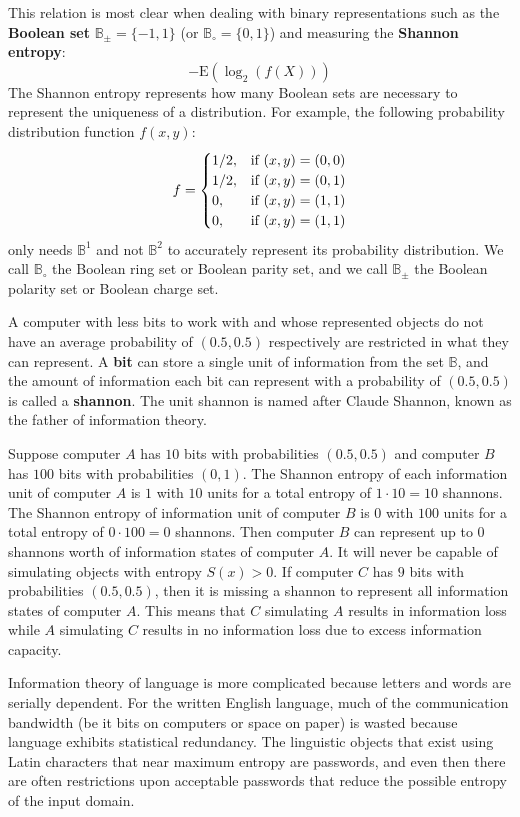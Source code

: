 \documentclass[10pt, a5paper, twoside, openright]{memoir}
\begin{document}
This relation is most clear when dealing with binary representations such as the \textbf{Boolean set} $\mathbb B_\pm = \{ -1, 1\}$ (or $\mathbb B_\circ = \{ 0, 1\}$) and measuring the \textbf{Shannon entropy}:
$$-\mathrm{E}(\log_2(f(X)))$$
The Shannon entropy represents how many Boolean sets are necessary to represent the uniqueness of a distribution. For example, the following probability distribution function $f(x, y)$:
$$f = 
\begin{cases}
1/2, & \textnormal{if} \ (x, y) = (0, 0) \\
1/2, & \textnormal{if} \ (x, y) = (0, 1) \\
0, & \textnormal{if} \ (x, y) = (1, 1) \\
0, & \textnormal{if} \ (x, y) = (1, 1)
\end{cases}
$$
only needs $\mathbb B^1$ and not $\mathbb B^2$ to accurately represent its probability distribution. We call $\mathbb B_\circ$ the Boolean ring set or Boolean parity set, and we call $\mathbb B_\pm$ the Boolean polarity set or Boolean charge set.

A computer with less bits to work with and whose represented objects do not have an average probability of $(0.5, 0.5)$ respectively are restricted in what they can represent. A \textbf{bit} can store a single unit of information from the set $\mathbb B$, and the amount of information each bit can represent with a probability of $(0.5, 0.5)$ is called a \textbf{shannon}. The unit shannon is named after Claude Shannon, known as the father of information theory. 

Suppose computer $A$ has $10$ bits with probabilities $(0.5, 0.5)$ and computer $B$ has $100$ bits with probabilities $(0,1)$. The Shannon entropy of each information unit of computer $A$ is $1$ with $10$ units for a total entropy of $1 \cdot 10 = 10$ shannons. The Shannon entropy of information unit of computer $B$ is $0$ with $100$ units for a total entropy of $0 \cdot 100 = 0$ shannons. Then computer $B$ can represent up to $0$ shannons worth of information states of computer $A$. It will never be capable of simulating objects with entropy $S(x) > 0$. If computer $C$ has $9$ bits with probabilities $(0.5, 0.5)$, then it is missing a shannon to represent all information states of computer $A$. This means that $C$ simulating $A$ results in information loss while $A$ simulating $C$ results in no information loss due to excess information capacity.

Information theory of language is more complicated because letters and words are serially dependent. For the written English language, much of the communication bandwidth (be it bits on computers or space on paper) is wasted because language exhibits statistical redundancy. The linguistic objects that exist using Latin characters that near maximum entropy are passwords, and even then there are often restrictions upon acceptable passwords that reduce the possible entropy of the input domain.
\end{document}
